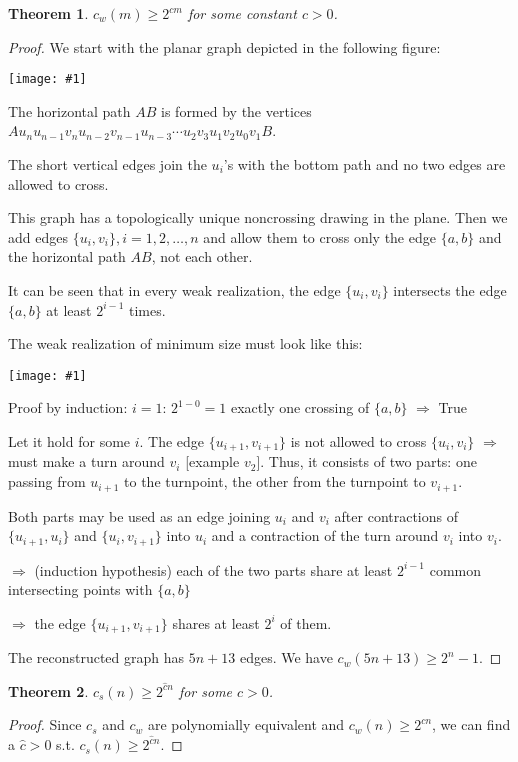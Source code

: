 \documentclass[12pt]{article}
\theoremstyle{plain} %
\newtheorem{theorem}{Theorem}
\newcommand{\set}[1]{\{#1\}}
\newcommand{\image}[1]{\begin{center}\texttt{[image: \#1]}\end{center}}
\begin{document}
\begin{theorem}
    \(c_w(m) \geq 2^{c m}\) for some constant \(c > 0\).
\end{theorem}

\begin{proof}
We start with the planar graph depicted in the following figure:

\image{images/figure-11.png}

The horizontal path \(AB\) is formed by 
the vertices \(A u_n u_{n-1} v_n u_{n-2} v_{n-1} u_{n-3} \cdots u_2 v_3 u_1 v_2 u_0 v_1 B \).

The short vertical edges join the \(u_i\)'s with the bottom path
and no two edges are allowed to cross.

This graph has a topologically unique noncrossing drawing in the plane.
Then we add edges \(\set{u_i, v_i}, i=1,2,\ldots, n \) and allow them to cross
only the edge \(\set{a,b}\) and the horizontal path \(AB\), not each other.

It can be seen that in every weak realization, the edge \(\set{u_i, v_i}\) intersects 
the edge \(\set{a,b}\) at least \(2^{i-1}\) times.

The weak realization of minimum size must look like this:

\image{images/figure-12.png}

Proof by induction:
\(i=1\): \(2^{1-0} = 1\) exactly one crossing of 
\(\set{a,b}\) \(\Rightarrow\) True

Let it hold for some \(i\). The edge \(\set{u_{i+1}, v_{i+1}}\)
is not allowed to cross \(\set{u_i, v_i}\) \(\Rightarrow\) must make 
a turn around \(v_i\) [example \(v_2\)].
Thus, it consists of two parts: one passing from \(u_{i+1}\) to 
the turnpoint, the other from the turnpoint to \(v_{i+1}\).

Both parts may be used as an edge joining \(u_i\) and \(v_i\) 
after contractions of \(\set{u_{i+1}, u_i}\) and \(\set{u_i, v_{i+1}}\) 
into \(u_i\) and a contraction of the turn around \(v_i\) into \(v_i\).

\(\Rightarrow\) (induction hypothesis) each of the two parts share at least 
\(2^{i-1}\) common intersecting points with \(\set{a,b}\)

\(\Rightarrow\) the edge \(\set{u_{i+1}, v_{i+1}}\) shares at least \(2^i\) of them.

The reconstructed graph has \(5n + 13\) edges. We have \(c_w(5n + 13) \geq 2^n - 1\).
\end{proof}

\begin{theorem}
    \(c_s(n) \geq 2^{\hat{c} n}\) for some \(c > 0\).
\end{theorem}

\begin{proof}
Since \(c_s\) and \(c_w\) are polynomially equivalent 
and \(c_w(n) \geq 2^{c n}\), we can find a 
\(\hat{c} > 0\) s.t. \(c_s(n) \geq 2^{\hat{c} n}\).
\end{proof}
\end{document}
